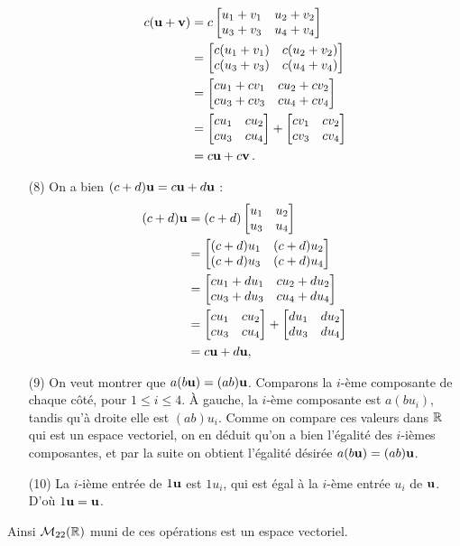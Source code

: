 \begin{myexample}
\begin{itemize}
\begin{align*}
c(\mathbf{u} + \mathbf{v}) &= c \left[ \begin{matrix} u_1+v_1 & u_2+v_2\\ u_3+v_3 & u_4+v_4 \end{matrix} \right] \\
&= \left[ \begin{matrix} c(u_1+v_1) & c(u_2+v_2)\\ c(u_3+v_3) & c(u_4+v_4) \end{matrix} \right] \\
&= \left[ \begin{matrix} cu_1+cv_1 &  cu_2+cv_2\\ cu_3+cv_3 & cu_4+cv_4 \end{matrix} \right]\\
&= \left[ \begin{matrix} cu_1 & cu_2 \\ cu_3 & cu_4 \end{matrix} \right]+ \left[ \begin{matrix} cv_1&cv_2\\cv_3&cv_4 \end{matrix} \right]\\
&= c\mathbf{u} + c\mathbf{v}\,.
\end{align*} 
\item[(8)] On a bien $(c+d)\mathbf{u} = c\mathbf{u} + d\mathbf{u}$ :
\begin{align*}
(c+d)\mathbf{u} &= (c+d)\left[ \begin{matrix} u_1 & u_2 \\ u_3 & u_4 \end{matrix} \right]\\
&= \left[ \begin{matrix} (c+d)u_1 & (c+d)u_2 \\ (c+d)u_3 & (c+d)u_4 \end{matrix} \right]\\
&= \left[ \begin{matrix} cu_1+du_1 & cu_2+du_2 \\ cu_3+du_3 & cu_4+du_4 \end{matrix} \right]\\
&= \left[ \begin{matrix} cu_1 & cu_2 \\ cu_3 & cu_4 \end{matrix} \right]+\left[ \begin{matrix} du_1 & du_2 \\ du_3 & du_4 \end{matrix} \right]\\
&= c\mathbf{u} + d\mathbf{u},
\end{align*}
\item[(9)] On veut montrer que $a(b\mathbf{u}) = (ab)\mathbf{u}$. Comparons la $i$-ème composante de chaque côté, pour $1 \leq i \leq 4$.  
À gauche, la $i$-ème composante est $a(b u_i)$, tandis qu'à droite elle est
$(ab)u_i$. Comme on compare ces valeurs dans $\mathbb{R}$ qui est un espace vectoriel, on en déduit qu'on a bien l'égalité des $i$-ièmes composantes, et par la suite on obtient l'égalité désirée $a(b\mathbf{u}) = (ab)\mathbf{u}$.
\item[(10)] La $i$-ième entrée de $1\mathbf{u}$ est $1u_i$, qui est égal à la
$i$-ème entrée $u_i$ de $\mathbf{u}$. D'où $1\mathbf{u} = \mathbf{u}$.
\end{itemize}
Ainsi $\mathcal M_{22}(\mathbb{R})$ muni de ces opérations est un espace vectoriel.
\end{myexample}





